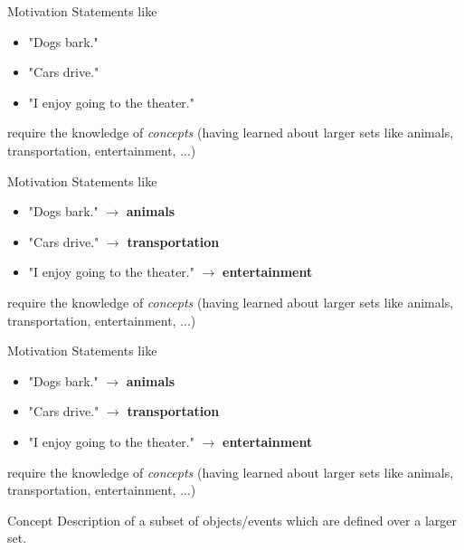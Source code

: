 \documentclass{beamer}
\begin{document}
\begin{frame}{Motivation}
Statements like 
\begin{itemize}
  \item "Dogs bark."
  \item "Cars drive."
  \item "I enjoy going to the theater."
\end{itemize}
require the knowledge of \emph{concepts} (having learned about larger sets like animals, transportation, entertainment, ...)
\end{frame}

\begin{frame}{Motivation}
Statements like 
\begin{itemize}
  \item "Dogs bark." $\rightarrow$ \textbf{animals}
  \item "Cars drive." $\rightarrow$ \textbf{transportation}
  \item "I enjoy going to the theater." $\rightarrow$ \textbf{entertainment}
\end{itemize}
require the knowledge of \emph{concepts} (having learned about larger sets like animals, transportation, entertainment, ...)
\end{frame}

\begin{frame}{Motivation}
Statements like 
\begin{itemize}
  \item "Dogs bark." $\rightarrow$ \textbf{animals}
  \item "Cars drive." $\rightarrow$ \textbf{transportation}
  \item "I enjoy going to the theater." $\rightarrow$ \textbf{entertainment}
\end{itemize}
require the knowledge of \emph{concepts} (having learned about larger sets like animals, transportation, entertainment, ...)


\begin{block}{Concept}
Description of a subset of objects/events which are defined over a larger set.
\end{block}


\end{frame}
\end{document}
